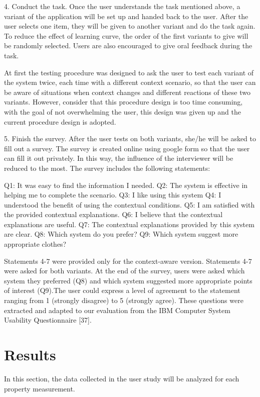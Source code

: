 4. Conduct the task.
Once the user understands the task mentioned above, a variant of the application will be set up and handed back to the user. After the user selects one item, they will be given to another variant and do the task again. To reduce the effect of learning curve, the order of the first variants to give will be randomly selected. Users are also encouraged to give oral feedback during the task. 

At first the testing procedure was designed to ask the user to test each variant of the system twice, each time with a different context scenario, so that the user can be aware of situations when context changes and different reactions of these two variants. However, consider that this procedure design is too time consuming, with the goal of not overwhelming the user, this design was given up and the current procedure design is adopted.

5. Finish the survey.
After the user tests on both variants, she/he will be asked to fill out a survey. The survey is created online using google form so that the user can fill it out privately. In this way, the influence of the interviewer will be reduced to the most. The survey includes the following statements:

Q1: It was easy to find the information I needed. 
Q2: The system is effective in helping me to complete the scenario. 
Q3: I like using this system
Q4: I understood the benefit of using the contextual conditions. 
Q5: I am satisfied with the provided contextual explanations. 
Q6: I believe that the contextual explanations are useful.
Q7: The contextual explanations provided by this system are clear. 
Q8: Which system do you prefer?
Q9: Which system suggest more appropriate clothes? 

Statements 4-7 were provided only for the context-aware version. Statements 4-7 were asked for both variants. At the end of the survey, users were asked which system they preferred (Q8) and which system suggested more appropriate points of interest (Q9).The user could express a level of agreement to the statement ranging from 1 (strongly disagree) to 5 (strongly agree). These questions were extracted and adapted to our evaluation from the IBM Computer System Usability Questionnaire [37]. 

\section{Results} \label{sec:results}

In this section, the data collected in the user study will be analyzed for each property measurement.

